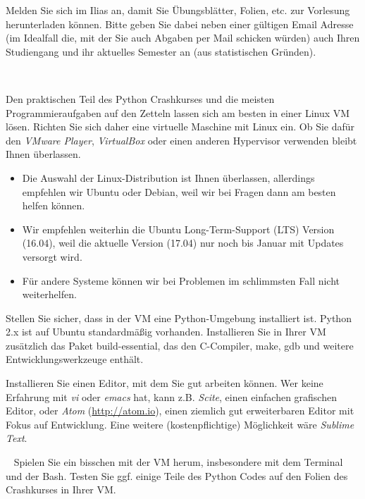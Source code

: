 \documentclass[]{base/exercise}
\begin{document}
Melden Sie sich im Ilias an, damit Sie Übungsblätter, Folien, etc. zur Vorlesung herunterladen können. Bitte geben Sie dabei neben einer gültigen Email Adresse (im Idealfall die, mit der Sie auch Abgaben per Mail schicken würden) auch Ihren Studiengang und ihr aktuelles Semester an (aus statistischen Gründen).

~

Den praktischen Teil des Python Crashkurses und die meisten Programmieraufgaben auf den Zetteln lassen sich am besten in einer Linux VM lösen. Richten Sie sich daher eine virtuelle Maschine mit Linux ein. Ob Sie dafür den \emph{VMware Player}, \emph{VirtualBox} oder einen anderen Hypervisor verwenden bleibt Ihnen überlassen.
\begin{itemize}
	\item Die Auswahl der Linux-Distribution ist Ihnen überlassen, allerdings empfehlen wir Ubuntu oder Debian, weil wir bei Fragen dann am besten helfen können.
	\item Wir empfehlen weiterhin die Ubuntu Long-Term-Support (LTS) Version (16.04), weil die aktuelle Version (17.04) nur noch bis Januar mit Updates versorgt wird.
	\item Für andere Systeme können wir bei Problemen im schlimmsten Fall nicht weiterhelfen.
\end{itemize}

Stellen Sie sicher, dass in der VM eine Python-Umgebung installiert ist. Python 2.x ist auf Ubuntu standardmäßig vorhanden. Installieren Sie in Ihrer VM zusätzlich das Paket build-essential, das den C-Compiler, make, gdb und weitere Entwicklungswerkzeuge enthält.

Installieren Sie einen Editor, mit dem Sie gut arbeiten können. Wer keine Erfahrung mit \emph{vi} oder \emph{emacs} hat, kann z.B. \emph{Scite}, einen einfachen grafischen Editor, oder \emph{Atom} (\url{http://atom.io}), einen ziemlich gut erweiterbaren Editor mit Fokus auf Entwicklung. Eine weitere (kostenpflichtige) Möglichkeit wäre \emph{Sublime Text}.

~
Spielen Sie ein bisschen mit der VM herum, insbesondere mit dem Terminal und der Bash. Testen Sie ggf. einige Teile des Python Codes auf den Folien des Crashkurses in Ihrer VM.
\end{document}
